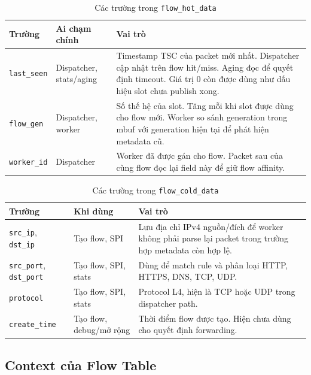 \documentclass[12pt,a4paper]{report}
\DeclareRobustCommand{\code}[1]{{\small\texttt{#1}}}
\begin{document}
\begin{table}[H]
\centering
\small
\caption{Các trường trong \code{flow\_hot\_data}}
\label{tab:hot_data}
\begin{tabularx}{\textwidth}{|L{2.8cm}|L{3.5cm}|Y|}
\hline
\textbf{Trường} & \textbf{Ai chạm chính} & \textbf{Vai trò} \\
\hline
\code{last\_seen} & Dispatcher, stats/aging & Timestamp TSC của packet mới nhất. Dispatcher cập nhật trên flow hit/miss. Aging đọc để quyết định timeout. Giá trị 0 còn được dùng như dấu hiệu slot chưa publish xong. \\
\hline
\code{flow\_gen} & Dispatcher, worker & Số thế hệ của slot. Tăng mỗi khi slot được dùng cho flow mới. Worker so sánh generation trong mbuf với generation hiện tại để phát hiện metadata cũ. \\
\hline
\code{worker\_id} & Dispatcher & Worker đã được gán cho flow. Packet sau của cùng flow đọc lại field này để giữ flow affinity. \\
\hline
\end{tabularx}
\end{table}

\begin{table}[H]
\centering
\small
\caption{Các trường trong \code{flow\_cold\_data}}
\label{tab:cold_data}
\begin{tabularx}{\textwidth}{|L{4.2cm}|C{2.5cm}|Y|}
\hline
\textbf{Trường} & \textbf{Khi dùng} & \textbf{Vai trò} \\
\hline
\code{src\_ip}, \code{dst\_ip} & Tạo flow, SPI & Lưu địa chỉ IPv4 nguồn/đích để worker không phải parse lại packet trong trường hợp metadata còn hợp lệ. \\
\hline
\code{src\_port}, \code{dst\_port} & Tạo flow, SPI, stats & Dùng để match rule và phân loại HTTP, HTTPS, DNS, TCP, UDP. \\
\hline
\code{protocol} & Tạo flow, SPI, stats & Protocol L4, hiện là TCP hoặc UDP trong dispatcher path. \\
\hline
\code{create\_time} & Tạo flow, debug/mở rộng & Thời điểm flow được tạo. Hiện chưa dùng cho quyết định forwarding. \\
\hline
\end{tabularx}
\end{table}

\subsection{Context của Flow Table}
\end{document}
